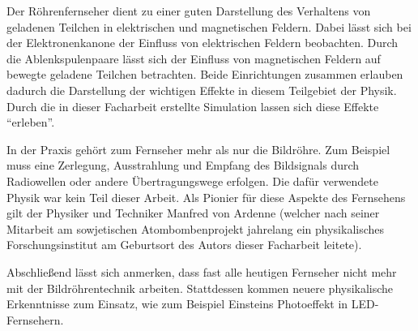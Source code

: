 Der Röhrenfernseher dient zu einer guten Darstellung des Verhaltens von geladenen Teilchen in elektrischen und magnetischen Feldern.
Dabei lässt sich bei der Elektronenkanone der Einfluss von elektrischen Feldern beobachten.  
Durch die Ablenkspulenpaare lässt sich der Einfluss von magnetischen Feldern auf bewegte geladene Teilchen betrachten.
Beide Einrichtungen zusammen erlauben dadurch die Darstellung der wichtigen Effekte in diesem Teilgebiet der Physik.
Durch die in dieser Facharbeit erstellte Simulation lassen sich diese Effekte "`erleben"'.

In der Praxis gehört zum Fernseher mehr als nur die Bildröhre.
Zum Beispiel muss eine Zerlegung, Ausstrahlung und Empfang des Bildsignals durch Radiowellen oder andere Übertragungswege erfolgen.
Die dafür verwendete Physik war kein Teil dieser Arbeit.
Als Pionier für diese Aspekte des Fernsehens gilt der Physiker und Techniker Manfred von Ardenne (welcher nach seiner Mitarbeit am sowjetischen Atombombenprojekt jahrelang ein physikalisches Forschungsinstitut am Geburtsort des Autors dieser Facharbeit leitete).

Abschließend lässt sich anmerken, dass fast alle heutigen Fernseher nicht mehr mit der Bildröhrentechnik arbeiten.
Stattdessen kommen neuere physikalische Erkenntnisse zum Einsatz, wie zum Beispiel Einsteins Photoeffekt in LED-Fernsehern.